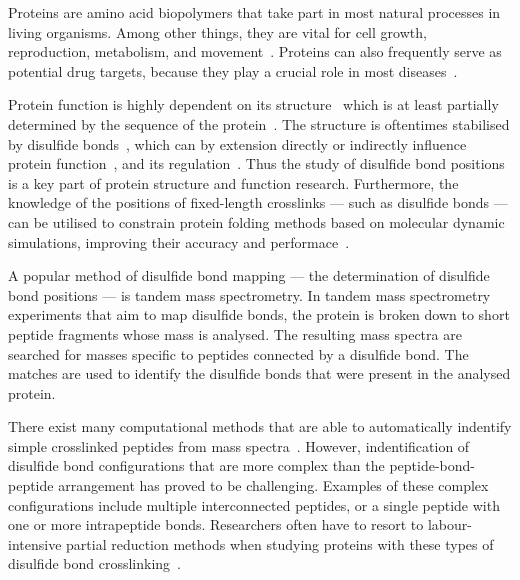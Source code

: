 

Proteins are amino acid biopolymers that take part in most natural processes in living organisms. Among other things, they are vital for cell growth, reproduction, metabolism, and movement~\cite{johnson1994sequential, prescott1968regulation, ketelaar2004actin, elston1998energy}. Proteins can also frequently serve as potential drug targets, because they play a crucial role in most diseases~\cite{konopatskaya2010protein, yamin2008amyloid}.

Protein function is highly dependent on its structure~\cite{orengo1999protein} which is at least partially determined by the sequence of the protein~\cite{anfinsen1973principles}. The structure is oftentimes stabilised by disulfide bonds~\cite{wedemeyer2000disulfide, mcauley2008contributions}, which can by extension directly or indirectly influence protein function~\cite{nagahara2011intermolecular}, and its regulation~\cite{chiu2019allosteric}. Thus the study of disulfide bond positions is a key part of protein structure and function research. Furthermore, the knowledge of the positions of fixed-length crosslinks --- such as disulfide bonds --- can be utilised to constrain protein folding methods based on molecular dynamic simulations, improving their accuracy and performace~\cite{brodie2017solving}.

A popular method of disulfide bond mapping --- the determination of disulfide bond positions --- is tandem mass spectrometry. In tandem mass spectrometry experiments that aim to map disulfide bonds, the protein is broken down to short peptide fragments whose mass is analysed. The resulting mass spectra are searched for masses specific to peptides connected by a disulfide bond. The matches are used to identify the disulfide bonds that were present in the analysed protein.

There exist many computational methods that are able to automatically indentify simple crosslinked peptides from mass spectra~\cite{lakbub2018recent, liu2014facilitating}. However, indentification of disulfide bond configurations that are more complex than the peptide-bond-peptide arrangement has proved to be challenging. Examples of these complex configurations include multiple interconnected peptides, or a single peptide with one or more intrapeptide bonds. Researchers often have to resort to labour-intensive partial reduction methods when studying proteins with these types of disulfide bond crosslinking~\cite{wu1997novel, li2013disulfide}.

